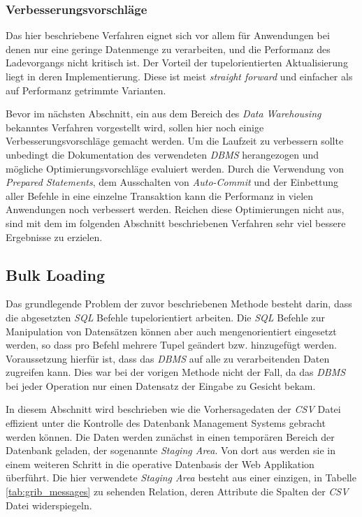 \subsubsection{Verbesserungsvorschläge}
Das hier beschriebene Verfahren eignet sich vor allem für Anwendungen
bei denen nur eine geringe Datenmenge zu verarbeiten, und die
Performanz des Ladevorgangs nicht kritisch ist. Der Vorteil der
tupelorientierten Aktualisierung liegt in deren Implementierung. Diese
ist meist \textit{straight forward} und einfacher als auf Performanz
getrimmte Varianten.

Bevor im nächsten Abschnitt, ein aus dem Bereich des \textit{Data
  Warehousing} bekanntes Verfahren vorgestellt wird, sollen hier noch
einige Verbesserungsvorschläge gemacht werden. Um die Laufzeit zu
verbessern sollte unbedingt die Dokumentation des verwendeten
\textit{DBMS} herangezogen und mögliche Optimierungsvorschläge
evaluiert werden. Durch die Verwendung von \textit{Prepared
  Statements}, dem Ausschalten von \textit{Auto-Commit} und der
Einbettung aller Befehle in eine einzelne Transaktion kann die
Performanz in vielen Anwendungen noch verbessert werden. Reichen diese
Optimierungen nicht aus, sind mit dem im folgenden Abschnitt
beschriebenen Verfahren sehr viel bessere Ergebnisse zu erzielen.

\subsection{Bulk Loading}

Das grundlegende Problem der zuvor beschriebenen Methode besteht
darin, dass die abgesetzten \textit{SQL} Befehle tupelorientiert
arbeiten. Die \textit{SQL} Befehle zur Manipulation von Datensätzen
können aber auch mengenorientiert eingesetzt werden, so dass pro
Befehl mehrere Tupel geändert bzw. hinzugefügt werden. Voraussetzung
hierfür ist, dass das \textit{DBMS} auf alle zu verarbeitenden Daten
zugreifen kann. Dies war bei der vorigen Methode nicht der Fall, da
das \textit{DBMS} bei jeder Operation nur einen Datensatz der Eingabe
zu Gesicht bekam.

In diesem Abschnitt wird beschrieben wie die Vorhersagedaten der
\textit{CSV} Datei effizient unter die Kontrolle des Datenbank
Management Systems gebracht werden können. Die Daten werden zunächst
in einen temporären Bereich der Datenbank geladen, der sogenannte
\textit{Staging Area}. Von dort aus werden sie in einem weiteren
Schritt in die operative Datenbasis der Web Applikation überführt. Die
hier verwendete \textit{Staging Area} besteht aus einer einzigen, in
Tabelle \ref{tab:grib_messages} zu sehenden Relation, deren Attribute
die Spalten der \textit{CSV} Datei widerspiegeln.

